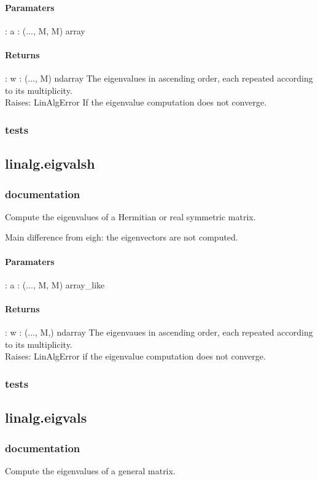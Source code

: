 \documentclass[a4paper,11pt]{article}
\begin{document}
\paragraph{Paramaters}: 
a : (..., M, M) array\\
\paragraph{Returns}:    
w : (..., M) ndarray
The eigenvalues in ascending order, each repeated according to its multiplicity.\\
Raises: 
LinAlgError
If the eigenvalue computation does not converge.\\



\subsubsection{tests}
\subsection{linalg.eigvalsh}
\subsubsection{documentation}
Compute the eigenvalues of a Hermitian or real symmetric matrix.

Main difference from eigh: the eigenvectors are not computed.
\paragraph{Paramaters}: 
a : (..., M, M) array\_like\\
\paragraph{Returns}:    
w : (..., M,) ndarray
The eigenvaues in ascending order, each repeated according to its multiplicity.\\
Raises: 
LinAlgError if the eigenvalue computation does not converge.

\subsubsection{tests}
\subsection{linalg.eigvals}
\subsubsection{documentation}
Compute the eigenvalues of a general matrix.
\end{document}
